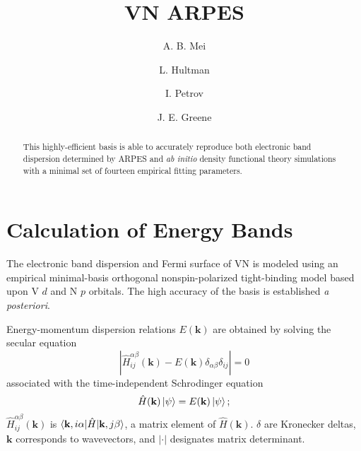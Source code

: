 \documentclass[twocolumn,showpacs,preprintnumbers,superscriptaddress,prb,floatfix,aps,10pt]{revtex4-1}
\renewcommand{\vec}[1]{\ensuremath{\mathbf{#1}}}
\newcommand*{\ham}{\hat{H}}
\begin{document}

\title{VN ARPES}

\author{A. B. Mei}

\author{L. Hultman}

\author{I. Petrov}

\author{J. E. Greene}

\begin{abstract}

This highly-efficient basis is able to accurately reproduce both electronic band dispersion determined by ARPES and \emph{ab initio} density functional theory simulations with a minimal set of fourteen empirical fitting parameters.
\end{abstract}

\maketitle





\section{Calculation of Energy Bands}
The electronic band dispersion and Fermi surface of VN is modeled using an empirical minimal-basis orthogonal nonspin-polarized  tight-binding model based upon V $d$ and N $p$ orbitals. The high accuracy of the basis is established \emph{a posteriori}. 

Energy-momentum dispersion relations $E(\vec{k})$ are obtained by solving the secular equation
\begin{equation}
\label{eq:secular}
\left| \ham^{\alpha\beta}_{ij}(\vec{k}) - E(\vec{k})\delta_{\alpha\beta}\delta_{ij} \right| = 0
\end{equation}
%
associated with the time-independent Schrodinger equation 
%
\begin{equation}
\label{eq:schrodinger}
\hat{H}(\vec{k}) \ket{\psi} = E(\vec{k}) \ket{\psi};  
\end{equation}
%
$\ham^{\alpha\beta}_{ij}(\vec{k})$ is $\braket{\vec{k},i\alpha | \ham | \vec{k},j\beta}$, a matrix element of $\ham(\vec{k})$. $\delta$ are Kronecker deltas, $\vec{k}$ corresponds to wavevectors, and $|\cdot |$ designates matrix determinant. 
\end{document}
